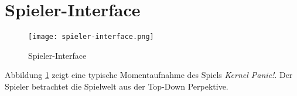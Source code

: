 \section{Spieler-Interface}
%
%
%
%
%
%
%
%
\begin{figure}[ht]
	\centering
	\texttt{[image: spieler-interface.png]}
	\caption{Spieler-Interface}
	\label{fig:spieler-interface}
\end{figure}
\pagebreak\noindent
Abbildung \ref{fig:spieler-interface} zeigt eine typische Momentaufnahme des Spiels \textit{Kernel Panic!}.
Der Spieler betrachtet die Spielwelt aus der Top-Down Perpektive.


